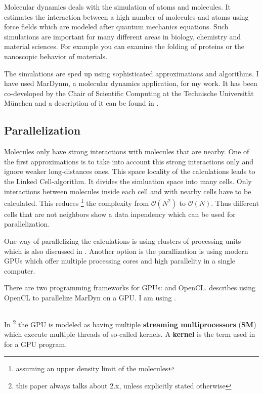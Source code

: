 Molecular dynamics deals with the simulation of atoms and molecules. It estimates the interaction between a high number of molecules and atoms using force fields which are modeled after quantum mechanics equations. 
Such simulations are important for many different areas in biology, chemistry and material sciences. For example you can examine the folding of proteins or the nanoscopic behavior of materials.

The simulations are sped up using sophisticated approximations and algorithms. I have used MarDynm, a molecular dynamics application, for my work. It has been co-developed by the Chair of Scientific Computing at the Technische Universit\"at M\"unchen and a description of it can be found in \TODO{}.

\subsection{Parallelization}
Molecules only have strong interactions with molecules that are nearby. One of the first approximations is to take into account this strong interactions only and ignore weaker long-distances ones.
This space locality of the calculations leads to the Linked Cell-algorithm. It divides the simluation space into many cells. Only interactions between molecules inside each cell and with nearby cells have to be calculated. This reduces \footnote{assuming an upper density limit of the molecules}  
 the complexity from $ \mathcal{O} \left( N^2 \right) $ to $ \mathcal{O} \left( N \right) $.
Thus different cells that are not neighbors show a data inpendency which can be used for parallelization.

One way of parallelizing the calculations is using clusters of processing units which is also discussed in \TODO{}. Another option is the parallization is using modern GPUs which offer multiple processing cores and high parallelity in a single computer.

There are two programming frameworks for GPUs: \cuda{} and OpenCL. 
 describes using OpenCL to parallelize MarDyn on a GPU. I am using \cuda{}.

\subsection{\cuda{}}
In \cuda{}\footnote{this paper always talks about \cuda{} 2.x, unless explicitly stated otherwise} the GPU is modeled as having multiple \textbf{streaming multiprocessors} (\textbf{SM}) which execute multiple threads of so-called kernels. A \textbf{kernel} is the term used in \cuda{} for a GPU program.

